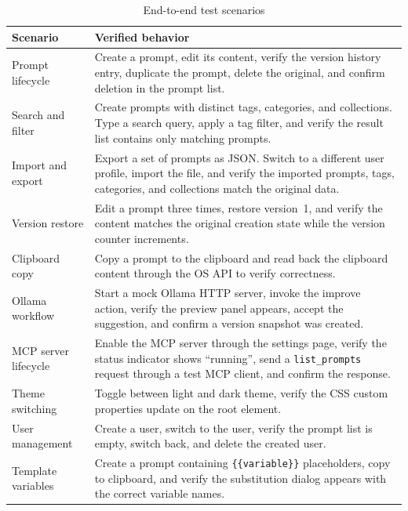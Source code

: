 \documentclass[a4paper, 11pt, oneside]{report}
\begin{document}
\begin{table}[H]
  \centering
  \caption{End-to-end test scenarios}
  \label{tab:e2e-tests}
  \begin{tabularx}{\textwidth}{l X}
    \toprule
    \textbf{Scenario} & \textbf{Verified behavior} \\
    \midrule
    Prompt lifecycle      & Create a prompt, edit its content, verify the version
                            history entry, duplicate the prompt, delete the
                            original, and confirm deletion in the prompt list. \\
    Search and filter     & Create prompts with distinct tags, categories, and
                            collections.  Type a search query, apply a tag filter,
                            and verify the result list contains only matching
                            prompts. \\
    Import and export     & Export a set of prompts as JSON.  Switch to a different
                            user profile, import the file, and verify the imported
                            prompts, tags, categories, and collections match the
                            original data. \\
    Version restore       & Edit a prompt three times, restore version~1, and
                            verify the content matches the original creation
                            state while the version counter increments. \\
    Clipboard copy        & Copy a prompt to the clipboard and read back the
                            clipboard content through the OS API to verify
                            correctness. \\
    Ollama workflow       & Start a mock Ollama HTTP server, invoke the improve
                            action, verify the preview panel appears, accept
                            the suggestion, and confirm a version snapshot was
                            created. \\
    MCP server lifecycle  & Enable the MCP server through the settings page,
                            verify the status indicator shows ``running'', send
                            a \texttt{list\_prompts} request through a test
                            MCP client, and confirm the response. \\
    Theme switching       & Toggle between light and dark theme, verify the CSS
                            custom properties update on the root element. \\
    User management       & Create a user, switch to the user, verify the prompt
                            list is empty, switch back, and delete the created
                            user. \\
    Template variables    & Create a prompt containing \texttt{\{\{variable\}\}}
                            placeholders, copy to clipboard, and verify the
                            substitution dialog appears with the correct
                            variable names. \\
    \bottomrule
  \end{tabularx}
\end{table}
\end{document}
